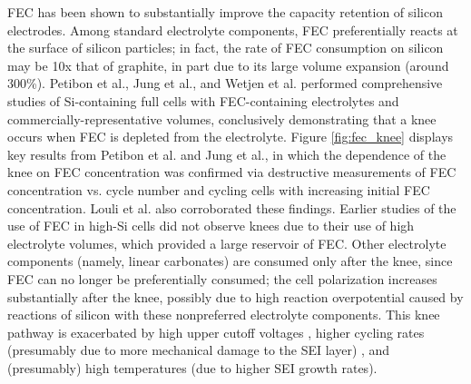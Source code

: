 \documentclass[journal=jpclcd,manuscript=article]{achemso}
\begin{document}
FEC has been shown to substantially improve the capacity retention of silicon electrodes.\cite{choi_effect_2006, etacheri_effect_2012}
Among standard electrolyte components, FEC preferentially reacts at the surface of silicon particles; in fact, the rate of FEC consumption on silicon may be 10x that of graphite, in part due to its large volume expansion (around 300\%)\cite{wetjen_differentiating_2017}{}.
Petibon et al.\cite{petibon_studies_2016}{},
Jung et al.\cite{jung_consumption_2016}{},
and Wetjen et al.\cite{wetjen_differentiating_2017}
performed comprehensive studies of Si-containing full cells with FEC-containing electrolytes and commercially-representative volumes,
conclusively demonstrating that a knee occurs when FEC is depleted from the electrolyte.
Figure \ref{fig:fec_knee} displays key results from Petibon et al.\cite{petibon_studies_2016} and
Jung et al.\cite{jung_consumption_2016}{}, in which the dependence of the knee on FEC concentration was confirmed via destructive measurements of FEC concentration vs. cycle number\cite{petibon_studies_2016} and cycling cells with increasing initial FEC concentration\cite{jung_consumption_2016}.
Louli et al.\cite{louli_operando_2019} also corroborated these findings.
Earlier studies of the use of FEC in high-Si cells\cite{choi_effect_2006, etacheri_effect_2012} did not observe knees due to their use of high electrolyte volumes, which provided a large reservoir of FEC.
Other electrolyte components (namely, linear carbonates) are consumed only after the knee, since FEC can no longer be preferentially consumed\cite{petibon_studies_2016}; the cell polarization increases substantially after the knee\cite{petibon_studies_2016, jung_consumption_2016, wetjen_differentiating_2017}, possibly due to high reaction overpotential caused by reactions of silicon with these nonpreferred electrolyte components.
This knee pathway is exacerbated by high upper cutoff voltages \cite{petibon_studies_2016}{}, higher cycling rates (presumably due to more mechanical damage to the SEI layer) \cite{petibon_studies_2016}{}, and (presumably) high temperatures (due to higher SEI growth rates).
\end{document}
